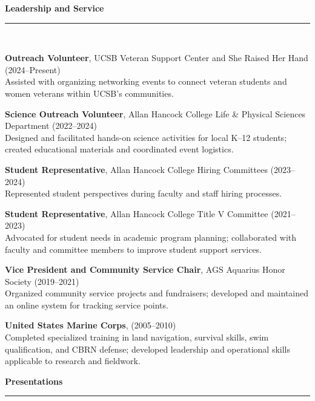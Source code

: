 \documentclass[letterpaper]{article}
\newcommand{\sectionheader}[1]{%
  \noindent\textbf{\Large #1}\\[-1.5ex]
  \noindent\rule{\linewidth}{0.4pt}\\[-1.5ex]
}
\newenvironment{biblist}{%
   \begin{list}{}{%
     \setlength{\labelwidth}{0pt}%
     \setlength{\labelsep}{1em}%
     \setlength{\leftmargin}{2em}%
     \setlength{\itemindent}{-1em}%
   }
}{\end{list}}
\begin{document}
\sectionheader{Leadership and Service}

\begin{biblist}

\item \textbf{Outreach Volunteer}, UCSB Veteran Support Center and She Raised Her Hand (2024--Present)\\
Assisted with organizing networking events to connect veteran students and women veterans within UCSB’s communities.

\item \textbf{Science Outreach Volunteer}, Allan Hancock College Life \& Physical Sciences Department (2022--2024)\\
Designed and facilitated hands-on science activities for local K–12 students; created educational materials and coordinated event logistics.

\item \textbf{Student Representative}, Allan Hancock College Hiring Committees (2023--2024)\\
Represented student perspectives during faculty and staff hiring processes.

\item \textbf{Student Representative}, Allan Hancock College Title V Committee (2021--2023)\\
Advocated for student needs in academic program planning; collaborated with faculty and committee members to improve student support services.

\item \textbf{Vice President and Community Service Chair}, AGS Aquarius Honor Society (2019--2021)\\
Organized community service projects and fundraisers; developed and maintained an online system for tracking service points.

\item \textbf{United States Marine Corps}, (2005--2010)\\
Completed specialized training in land navigation, survival skills, swim qualification, and CBRN defense; developed leadership and operational skills applicable to research and fieldwork.


\end{biblist}


\sectionheader{Presentations}
\end{document}
